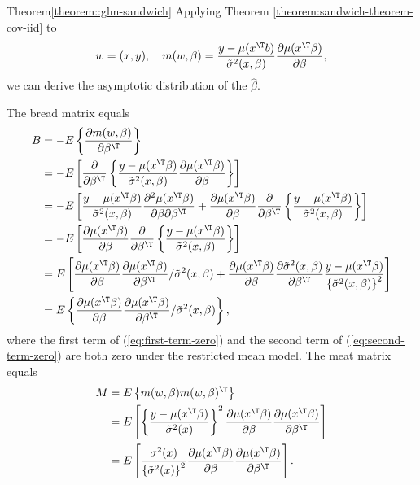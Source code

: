  
 \begin{myproof}{Theorem}{\ref{theorem::glm-sandwich}}
 Applying Theorem \ref{theorem:sandwich-theorem-cov-iid} to 
\[
w=(x,y),\quad m(w,\beta)=\frac{y-\mu(x^{\T} b)}{\tilde{\sigma}^{2}(x, \beta)}\frac{\partial\mu(x^{\T} \beta)}{\partial \beta },
\]
we can derive the asymptotic distribution of the $\hat{\beta}$. 

The bread matrix equals
\begin{align}
B & =-E\left\{ \frac{\partial m(w,\beta)}{\partial\beta^{\T}}\right\} \nonumber \\
 & =-E\left[\frac{\partial}{\partial\beta^{\T}}\left\{ \frac{y-\mu(x^{\T}\beta)}{\tilde{\sigma}^{2}(x,\beta)}\frac{\partial\mu(x^{\T}\beta)}{\partial\beta}\right\} \right]\nonumber \\
 & =-E\left[\frac{y-\mu(x^{\T}\beta)}{\tilde{\sigma}^{2}(x,\beta)}\frac{\partial^{2}\mu(x^{\T}\beta)}{\partial\beta\partial\beta^{\T}}+\frac{\partial\mu(x^{\T}\beta)}{\partial\beta}\frac{\partial}{\partial\beta^{\T}}\left\{ \frac{y-\mu(x^{\T}\beta)}{\tilde{\sigma}^{2}(x,\beta)}\right\} \right]\label{eq:first-term-zero}\\
 & =-E\left[\frac{\partial\mu(x^{\T}\beta)}{\partial\beta}\frac{\partial}{\partial\beta^{\T}}\left\{ \frac{y-\mu(x^{\T}\beta)}{\tilde{\sigma}^{2}(x,\beta)}\right\} \right]\nonumber \\
 & =E\left[\frac{\partial\mu(x^{\T}\beta)}{\partial\beta}\frac{\partial\mu(x^{\T}\beta)}{\partial\beta^{\T}}/\tilde{\sigma}^{2}(x,\beta)+\frac{\partial\mu(x^{\T}\beta)}{\partial\beta}\frac{\partial\tilde{\sigma}^{2}(x,\beta)}{\partial\beta^{\T}}\frac{y-\mu(x^{\T}\beta)}{\left\{ \tilde{\sigma}^{2}(x,\beta)\right\} ^{2}}\right]\label{eq:second-term-zero}\\
 & =E\left\{ \frac{\partial\mu(x^{\T}\beta)}{\partial\beta}\frac{\partial\mu(x^{\T}\beta)}{\partial\beta^{\T}}/\tilde{\sigma}^{2}(x,\beta)\right\} ,\nonumber 
\end{align}
where the first term of (\ref{eq:first-term-zero}) and the second
term of (\ref{eq:second-term-zero}) are both zero under the restricted
mean model. The meat matrix equals
\begin{align*}
M & =E\left\{ m(w,\beta)m(w,\beta)^{\T}\right\} \\
 & =E\left[\left\{ \frac{y-\mu(x^{\T}\beta)}{\tilde{\sigma}^{2}(x)}\right\} ^{2}\frac{\partial\mu(x^{\T}\beta)}{\partial\beta}\frac{\partial\mu(x^{\T}\beta)}{\partial\beta^{\T}}\right]\\
 & =E\left[\frac{\sigma^{2}(x)}{\left\{ \tilde{\sigma}^{2}(x)\right\} ^{2}}\frac{\partial\mu(x^{\T}\beta)}{\partial\beta}\frac{\partial\mu(x^{\T}\beta)}{\partial\beta^{\T}}\right].
\end{align*}
 \end{myproof}
 
